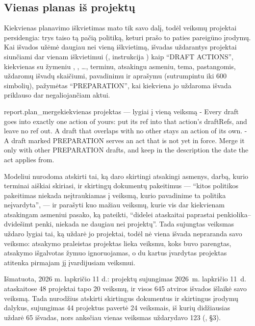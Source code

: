 \subsection{Vienas planas iš projektų}

Kiekvienas planavimo iškvietimas mato tik savo dalį, todėl veiksmų projektai persidengia: trys
taiso tą pačią politiką, keturi prašo to paties pareigūno įrodymų. Kai išvados užėmė daugiau nei
vieną iškvietimą, išvadas uždarantys projektai siunčiami dar vienam iškvietimui
(, instrukcija ) kaip \enquote{DRAFT ACTIONS},
kiekvienas su žymeniu , , \ldots{}, terminu, atsakingu asmeniu, tema,
pastangomis, uždaromų išvadų skaičiumi, pavadinimu ir aprašymu (sutrumpintu iki 600 simbolių),
pažymėtas \enquote{PREPARATION}, kai kiekviena jo uždaroma išvada priklauso dar negaliojančiam
aktui.

\begin{promptexcerpt}{report.plan_merge}{kiekvienas projektas --- lygiai į vieną veiksmą}
  - Every draft goes into exactly one action of yours: put its ref into that action's
    draftRefs, and leave no ref out. A draft that overlaps with no other stays an
    action of its own.
  - A draft marked PREPARATION serves an act that is not yet in force. Merge it only
    with other PREPARATION drafts, and keep in the description the date the act
    applies from.
\end{promptexcerpt}

Modeliui nurodoma atskirti tai, ką daro skirtingi atsakingi asmenys, darbą, kurio terminai
aiškiai skiriasi, ir skirtingų dokumentų pakeitimus --- \enquote{kitos politikos pakeitimas
niekada neįtraukiamas į veiksmą, kurio pavadinime ta politika neįvardyta}, --- ir parašyti kuo
mažiau veiksmų, kurie vis dar kiekvienam atsakingam asmeniui pasako, ką pateikti,
\enquote{didelei ataskaitai paprastai penkiolika--dvidešimt penki, niekada ne daugiau nei
projektų}. Tada sujungtas veiksmas uždaro lygiai tai, ką uždarė jo projektai, todėl nė viena
išvada nepraranda savo veiksmo: atsakymo praleistas projektas lieka veiksmu, koks buvo
parengtas, atsakymo išgalvotas žymuo ignoruojamas, o du kartus įvardytas projektas atitenka
pirmajam jį įvardijusiam veiksmui.

\begin{lessonbox}{Išmatuota, 2026 m. lapkričio 11 d.: projektų sujungimas}
2026~m. lapkričio 11~d. ataskaitose 48 projektai tapo 20 veiksmų, ir visos 645 atviros išvados
išlaikė savo veiksmą. Tada nurodžius atskirti skirtingus dokumentus ir skirtingus įrodymų
dalykus, sujungimas 44 projektus pavertė 24 veiksmais, iš kurių didžiausias uždarė 65 išvadas,
nors anksčiau vienas veiksmas uždarydavo 123 (, §3).
\end{lessonbox}

